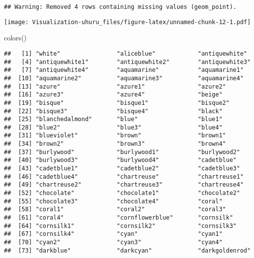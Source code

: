 \documentclass[
]{article}
\newenvironment{Shaded}{\begin{snugshade}}{\end{snugshade}}
\newcommand{\FunctionTok}[1]{\textcolor[rgb]{0.00,0.00,0.00}{#1}}
\newcommand{\NormalTok}[1]{#1}
\begin{document}
\begin{verbatim}
## Warning: Removed 4 rows containing missing values (geom_point).
\end{verbatim}

\texttt{[image: Visualization-uhuru\_files/figure-latex/unnamed-chunk-12-1.pdf]}

\begin{Shaded}
\begin{Highlighting}[]
\FunctionTok{colors}\NormalTok{()}
\end{Highlighting}
\end{Shaded}

\begin{verbatim}
##   [1] "white"                "aliceblue"            "antiquewhite"        
##   [4] "antiquewhite1"        "antiquewhite2"        "antiquewhite3"       
##   [7] "antiquewhite4"        "aquamarine"           "aquamarine1"         
##  [10] "aquamarine2"          "aquamarine3"          "aquamarine4"         
##  [13] "azure"                "azure1"               "azure2"              
##  [16] "azure3"               "azure4"               "beige"               
##  [19] "bisque"               "bisque1"              "bisque2"             
##  [22] "bisque3"              "bisque4"              "black"               
##  [25] "blanchedalmond"       "blue"                 "blue1"               
##  [28] "blue2"                "blue3"                "blue4"               
##  [31] "blueviolet"           "brown"                "brown1"              
##  [34] "brown2"               "brown3"               "brown4"              
##  [37] "burlywood"            "burlywood1"           "burlywood2"          
##  [40] "burlywood3"           "burlywood4"           "cadetblue"           
##  [43] "cadetblue1"           "cadetblue2"           "cadetblue3"          
##  [46] "cadetblue4"           "chartreuse"           "chartreuse1"         
##  [49] "chartreuse2"          "chartreuse3"          "chartreuse4"         
##  [52] "chocolate"            "chocolate1"           "chocolate2"          
##  [55] "chocolate3"           "chocolate4"           "coral"               
##  [58] "coral1"               "coral2"               "coral3"              
##  [61] "coral4"               "cornflowerblue"       "cornsilk"            
##  [64] "cornsilk1"            "cornsilk2"            "cornsilk3"           
##  [67] "cornsilk4"            "cyan"                 "cyan1"               
##  [70] "cyan2"                "cyan3"                "cyan4"               
##  [73] "darkblue"             "darkcyan"             "darkgoldenrod"       

\end{verbatim}
\end{document}
